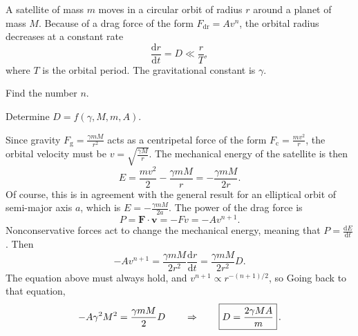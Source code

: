 \documentclass[../TST.tex]{subfiles}
\begin{document}
\begin{pproblem}
A satellite of mass $m$ moves  in a circular orbit of radius $r$ around a planet of mass $M$. Because of a drag force of the form $F_\mathrm{dr}=Av^n$, the orbital radius decreases at a constant rate
\begin{equation*}
	\frac{\mathrm{d}r}{\mathrm{d}t}=D\ll \frac{r}{T}
,
\end{equation*}
where $T$ is the orbital period. The gravitational constant is $\gamma$.
\begin{subpart}
\item Find the number $n$.
\item Determine $D=f(\gamma,M,m,A)$.
\end{subpart}
\end{pproblem}

\ifprob \else
\begin{solution}
 Since gravity $F_\mathrm{g}=\frac{\gamma mM}{r^2}$ acts as a centripetal force of the form $F_\mathrm{c}=\frac{mv^2}{r}$, the orbital velocity must be $v=\sqrt{\frac{\gamma M}{r}}$. The mechanical energy of the satellite is then  
\begin{equation*}
E=\frac{mv^2}{2}-\frac{\gamma mM}{r}=-\frac{\gamma m M}{2r}
.
\end{equation*}
Of course, this is in agreement with the general result for an elliptical orbit of semi-major axis $a$, which is $E=-\frac{\gamma m M}{2a}$. 
The power of the drag force is 
\begin{equation*}
	P=\mathbf{F}\cdot \mathbf{v}=-Fv=-Av^{n+1}
.
\end{equation*}
Nonconservative forces act to change the mechanical energy, meaning that $P=\frac{\mathrm{d}E}{\mathrm{d}t}$. Then
\begin{equation*}
	-Av^{n+1}=\frac{\gamma mM}{2r^2}\frac{\mathrm{d}r}{\mathrm{d}t}=\frac{\gamma m M}{2r^2}D
.
\end{equation*}
The equation above must always hold, and $v^{n+1}\propto r^{-(n+1)/2}$, so  Going back to that equation,
\begin{equation*}
	-A\gamma^2M^2 = \frac{\gamma m M}{2}D \quad\quad\Rightarrow\quad\quad \boxed{D=\frac{2\gamma MA}{m}}\,.\\[3ex]
\end{equation*}
\end{solution}
\fi
\end{document}

